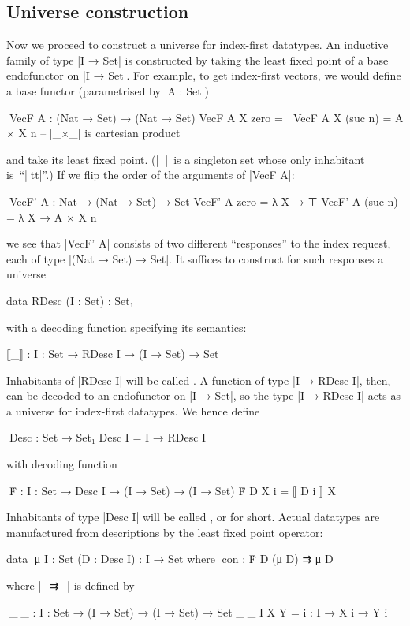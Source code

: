 \subsection{Universe construction}
\label{sec:Desc}

Now we proceed to construct a universe for index-first datatypes.
An inductive family of type |I → Set| is constructed by taking the least fixed point of a base endofunctor on |I → Set|.
For example, to get index-first vectors, we would define a base functor (parametrised by |A : Set|)
\begin{code}
^^^VecF A : (Nat → Set) → (Nat → Set)
VecF A X zero     =  ⊤
VecF A X (suc n)  =  A × X n  -- |_×_| is cartesian product
\end{code}
and take its least fixed point.
(|^^^⊤|~is a singleton set whose only inhabitant is~``|^^^tt|''.)
If we flip the order of the arguments of |VecF A|:
\begin{code}
^^^VecF' A : Nat → (Nat → Set) → Set
VecF' A zero     =  λ X → ⊤
VecF' A (suc n)  =  λ X → A × X n
\end{code}
we see that |VecF' A| consists of two different ``responses'' to the index request, each of type |(Nat → Set) → Set|.
It suffices to construct for such responses a universe
\begin{code}
data RDesc (I : Set) : Set₁
\end{code}
with a decoding function specifying its semantics:
\begin{code}
⟦_⟧ : {I : Set} → RDesc I → (I → Set) → Set
\end{code}
Inhabitants of |RDesc I| will be called .
A function of type |I → RDesc I|, then, can be decoded to an endofunctor on |I → Set|, so the type |I → RDesc I| acts as a universe for index-first datatypes.
We hence define
\begin{code}
^^^Desc : Set → Set₁
Desc I = I → RDesc I
\end{code}
with decoding function
\begin{code}
^^^Ḟ : {I : Set} → Desc I → (I → Set) → (I → Set)
Ḟ D X i = ⟦ D i ⟧ X
\end{code}
Inhabitants of type |Desc I| will be called , or  for short.
Actual datatypes are manufactured from descriptions by the least fixed point operator:
\begin{code}
data ^^^μ {I : Set} (D : Desc I) : I → Set where
  ^^^con : Ḟ D (μ D) ⇉ μ D
\end{code}
where |_⇉_| is defined by
\begin{code}
^^^_⇉_ : {I : Set} → (I → Set) → (I → Set) → Set
_⇉_ {I} X Y = {i : I} → X i → Y i
\end{code}

